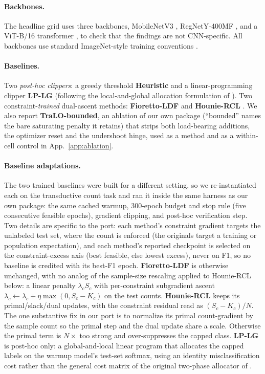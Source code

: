 \documentclass[10pt]{article}
\begin{document}
\paragraph{Backbones.}
The headline grid uses three backbones, MobileNetV3
\citep{howard2019searching}, RegNetY-400MF \citep{radosavovic2020designing},
and a ViT-B/16 transformer \citep{dosovitskiy2020image}, to check that the
findings are not CNN-specific. All backbones use standard ImageNet-style
training conventions \citep{he2016deep}.

\paragraph{Baselines.}
Two \emph{post-hoc clippers}: a greedy threshold \textbf{Heuristic} and a
linear-programming clipper \textbf{LP-LG} (following the local-and-global
allocation formulation of \citealt{shifman2025classification}). Two
constraint-\emph{trained} dual-ascent
methods: \textbf{Fioretto-LDF} \citep{fioretto2020lagrangian} and
\textbf{Hounie-RCL} \citep{hounie2023resilient}. We also report
\textbf{TraLO-bounded}, an ablation of our own package (``bounded'' names
the bare saturating penalty it retains) that strips both load-bearing
additions, the optimizer reset and the undershoot hinge, used as a method
and as a within-cell control in App.~\ref{app:ablation}.

\paragraph{Baseline adaptations.}
The two trained baselines were built for a different setting, so we
re-instantiated each on the transductive count task and ran it inside the
same harness as our own package: the same cached warmup, $300$-epoch budget
and stop rule (five consecutive feasible epochs), gradient clipping, and
post-hoc verification step. Two details are specific to the port: each
method's constraint gradient targets the unlabeled test set, where the
count is enforced (the originals target a training or population
expectation), and each method's reported checkpoint is selected on the
constraint-excess axis (best feasible, else lowest excess), never on F1, so
no baseline is credited with its best-F1 epoch. \textbf{Fioretto-LDF} is
otherwise unchanged, with no analog of the sample-size rescaling applied to
Hounie-RCL below: a linear penalty $\lambda_c S_c$ with per-constraint
subgradient ascent
$\lambda_c\!\leftarrow\!\lambda_c+\eta\max(0,S_c\!-\!K_c)$ on the test
counts. \textbf{Hounie-RCL} keeps its primal/slack/dual updates, with the
constraint residual read as $(S_c\!-\!K_c)/N$. The one substantive fix in
our port is to normalize its primal count-gradient by the sample count so
the primal step and the dual update share a scale. Otherwise the primal
term is $N\times$ too strong and over-suppresses the capped class.
\textbf{LP-LG} is post-hoc only: a global-and-local linear program that
allocates the capped labels on the warmup model's test-set softmax, using
an identity misclassification cost rather than the general cost matrix
of the original two-phase allocator of
\citet{shifman2025classification}.
\end{document}
